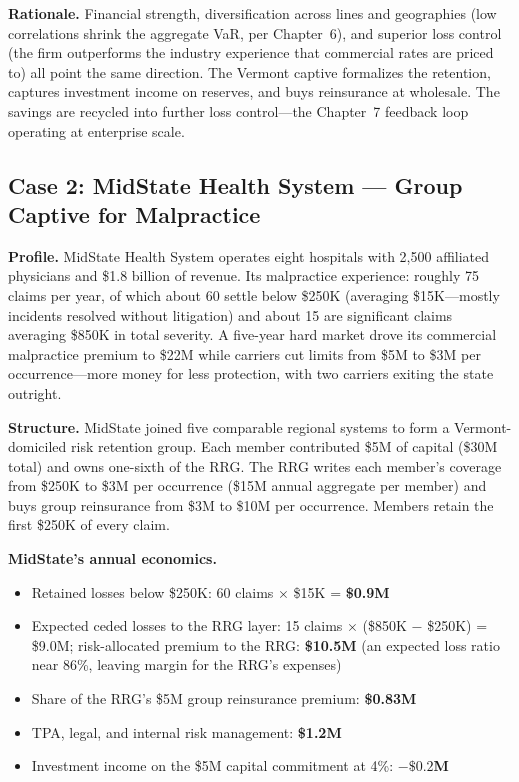 \documentclass[11pt,openany]{book}
\providecommand{\tightlist}{\setlength{\itemsep}{0pt}\setlength{\parskip}{0pt}}
\begin{document}
\textbf{Rationale.} Financial strength, diversification across lines and
geographies (low correlations shrink the aggregate VaR, per
Chapter~6), and superior loss control (the firm
outperforms the industry experience that commercial rates are priced to) all
point the same direction. The Vermont captive formalizes the retention,
captures investment income on reserves, and buys reinsurance at wholesale.
The savings are recycled into further loss control---the
Chapter~7 feedback loop operating at enterprise scale.

\subsection{Case 2: MidState Health System --- Group Captive for Malpractice}
\label{subsec:midstate-case}

\textbf{Profile.} MidState Health System operates eight hospitals with 2,500
affiliated physicians and \$1.8 billion of revenue. Its malpractice
experience: roughly 75 claims per year, of which about 60 settle below \$250K
(averaging \$15K---mostly incidents resolved without litigation) and about 15
are significant claims averaging \$850K in total severity. A five-year hard
market drove its commercial malpractice premium to \$22M while carriers cut
limits from \$5M to \$3M per occurrence---more money for less protection,
with two carriers exiting the state outright.

\textbf{Structure.} MidState joined five comparable regional systems to form
a Vermont-domiciled risk retention group. Each member contributed \$5M of
capital (\$30M total) and owns one-sixth of the RRG. The RRG writes each
member's coverage from \$250K to \$3M per occurrence (\$15M annual aggregate
per member) and buys group reinsurance from \$3M to \$10M per occurrence.
Members retain the first \$250K of every claim.

\textbf{MidState's annual economics.}
\begin{itemize}\tightlist
  \item Retained losses below \$250K: 60 claims \(\times\) \$15K =
        \textbf{\$0.9M}
  \item Expected ceded losses to the RRG layer: 15 claims \(\times\)
        (\$850K \(-\) \$250K) = \$9.0M; risk-allocated premium to the RRG:
        \textbf{\$10.5M} (an expected loss ratio near 86\%, leaving margin
        for the RRG's expenses)
  \item Share of the RRG's \$5M group reinsurance premium: \textbf{\$0.83M}
  \item TPA, legal, and internal risk management: \textbf{\$1.2M}
  \item Investment income on the \$5M capital commitment at 4\%:
        \textbf{\(-\$0.2\)M}
\end{itemize}
\end{document}
